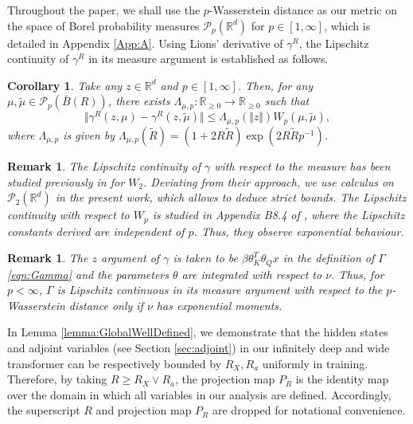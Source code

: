 \documentclass{article}
\newtheorem{remark}[theorem]{Remark}
\newtheorem{corollary}[theorem]{Corollary}
\newcommand{\R}{\mathbb{R}}
\begin{document}
Throughout the paper, we shall use the $p$-Wasserstein distance as our metric on the space of Borel probability measures $\mathcal P_p(\R^d)$ for $p\in[1,\infty]$, which is detailed in Appendix \ref{App:A}. Using Lions' derivative of $\gamma^R$, the Lipschitz continuity of $\gamma^R$ in its measure argument is established as follows.
\begin{corollary}\label{corr:LipMu} 
Take any $z \in \mathbb{R}^d$ and $p\in [1,\infty]$. Then, for any $\mu,\tilde{\mu}\in \mathcal{P}_p(\bar B(R))$, there exists $\Lambda_{\mu,p}: \mathbb R_{\ge0}\to \mathbb R_{\ge 0}$  such that
    \[ \Vert \gamma^R(z,\mu)-\gamma^R(z,\tilde{\mu})\Vert \le \Lambda_{\mu,p}(\Vert z \Vert) W_p(\mu, \tilde{\mu}), \]
    where $\Lambda_{\mu,p}$ is given by
$
\Lambda_{\mu,p}(\tilde R) =(1+2R\tilde R)\exp(2R\tilde Rp^{-1})
$.
\end{corollary}
\begin{remark}
 The Lipschitz continuity of $\gamma$ with respect to the measure has been studied previously in \cite{geshkovski2024emergenceclustersselfattentiondynamics,how-smooth-is-attention} for $W_2$.
 Deviating from their approach, we use calculus on $\mathcal P_2(\R^d)$ in the present work, which allows to deduce strict bounds. The Lipschitz continuity with respect to $W_p$ is studied in Appendix B8.4 of \cite{castin2025unifiedperspectivedynamicsdeep}, where the Lipschitz constants derived are independent of $p$. Thus, they observe exponential behaviour.
\end{remark}
\begin{remark} The $z$ argument of $\gamma$ is taken to be $\beta \theta_K^T\theta_Q x$ in the definition of $\Gamma$ \eqref{eqn:Gamma} and the parameters $\theta$ are integrated with respect to $\nu$. Thus, for $p<\infty$,  $\Gamma$ is Lipschitz continuous in its measure argument with respect to the $p$-Wasserstein distance only if $\nu$ has exponential moments.
\end{remark}
In Lemma \ref{lemma:GlobalWellDefined}, we demonstrate that the hidden states and adjoint variables (see Section \ref{sec:adjoint}) in our infinitely deep and wide transformer can be respectively bounded by $ R_X,R_a$ uniformly in training. Therefore, by taking $R\ge R_X\vee R_a$, the projection map $P_R$ is the identity map over the domain in which all variables in our analysis are defined. Accordingly, the superscript $R$ and projection map $P_R$ are dropped for notational convenience.
\end{document}
